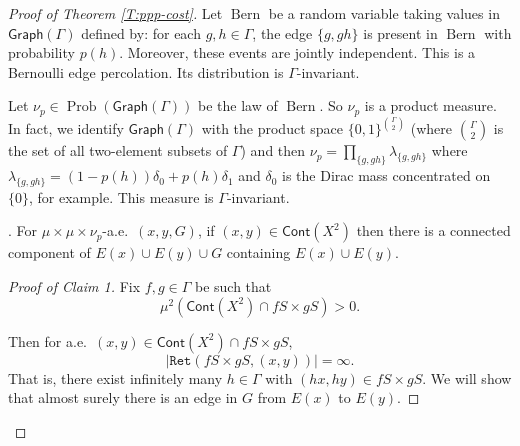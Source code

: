 \documentclass[12pt]{article}
\theoremstyle{plain}
\theoremstyle{definition}
\theoremstyle{remark}
\newcommand{\G}{\Gamma}
\renewcommand\d{\delta}
\newcommand{\Bern}{\operatorname{Bern}}
\newcommand\Pois{\operatorname{Pois}}
\newcommand\Prob{\operatorname{Prob}}
\newcommand\Ret{\mathtt{Ret}}
\def\cc{{\curvearrowright}}
\begin{document}
\begin{proof}[Proof of Theorem \ref{T:ppp-cost}]
Let $\Bern$ be a random variable taking values in $\mathsf{Graph}(\G)$ defined by: for each $g,h\in \G$, the edge $\{g,gh\}$ is present in $\Bern$ with probability $p(h)$. Moreover, these events are jointly independent. This is a Bernoulli edge percolation. Its distribution is $\G$-invariant.


Let $\nu_p \in \Prob(\mathsf{Graph}(\G))$ be the law of $\Bern$. So $\nu_p$ is a product measure. In fact, we identify $\mathsf{Graph}(\G)$ with the product space $\{0,1\}^{{\G\choose 2}}$ (where ${\G\choose 2}$ is the set of all two-element subsets of $\G$) and then $\nu_p = \prod_{\{g,gh\}} \lambda_{\{g,gh\}}$ where $\lambda_{\{g,gh\}} = (1-p(h))\d_0 + p(h)\d_1$ and $\d_0$ is the Dirac mass concentrated on $\{0\}$, for example. This measure is $\G$-invariant.





. For 
$\mu\times \mu \times \nu_p$-a.e.\ $(x,y,G)$, if $(x,y)\in \mathsf{Cont}(X^2)$ then there is a connected component of $E(x)\cup E(y)\cup G$ containing $E(x)\cup E(y)$. 

\begin{proof}[Proof of Claim 1]

Fix $f,g \in \G$  be such that 
$$\mu^2(\mathsf{Cont}(X^2) \cap  fS\times gS)>0.$$

Then for a.e.\ $(x,y) \in \mathsf{Cont}(X^2) \cap fS\times gS$,
$$|\Ret(fS\times gS, (x,y))|=\infty.$$
That is, there exist infinitely many $h\in \G$ with $(hx,hy) \in fS\times gS$. We will show that almost surely there is an edge in $G$ from $E(x)$ to $E(y)$.


\end{proof}
\end{proof}
\end{document}
